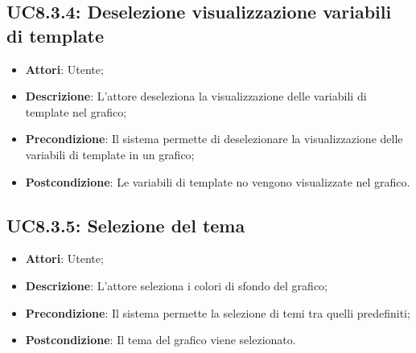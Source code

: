 \subsection{UC8.3.4: Deselezione visualizzazione variabili di template}
\begin{itemize}
	\item \textbf{Attori}: Utente;
	\item \textbf{Descrizione}: L'attore deseleziona la visualizzazione delle variabili di template nel grafico;
	\item \textbf{Precondizione}: Il sistema permette di deselezionare la visualizzazione delle variabili di template in un grafico;
	\item \textbf{Postcondizione}: Le variabili di template no vengono visualizzate nel grafico.
\end{itemize}

\subsection{UC8.3.5: Selezione del tema}
\begin{itemize}
	\item \textbf{Attori}: Utente;
	\item \textbf{Descrizione}: L'attore seleziona i colori di sfondo del grafico; 
	\item \textbf{Precondizione}: Il sistema permette la selezione di temi tra quelli predefiniti;
	\item \textbf{Postcondizione}: Il tema del grafico viene selezionato.
\end{itemize}

